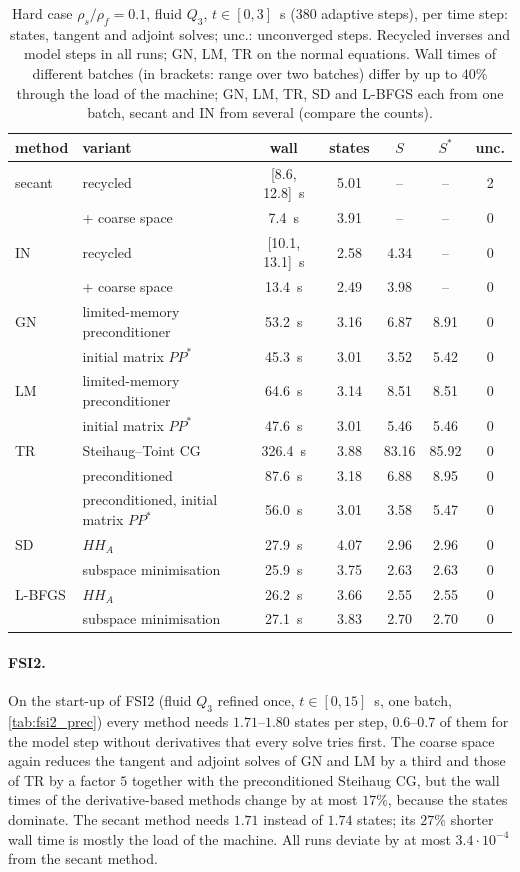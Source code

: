 \documentclass[11pt,a4paper]{article}
\theoremstyle{definition}
\theoremstyle{remark}
\begin{document}
\begin{table}[ht]\centering
\caption{Hard case $\rho_s/\rho_f=0.1$, fluid $Q_3$, $t\in[0,3]$~s ($380$ adaptive steps), per time
step: states, tangent and adjoint solves; unc.: unconverged steps. Recycled inverses and model
steps in all runs; GN, LM, TR on the normal equations. Wall times of different batches (in
brackets: range over two batches) differ by up to $40\%$ through the load of the machine; GN, LM,
TR, SD and L-BFGS each from one batch, secant and IN from several (compare the counts).}\label{tab:hard}
\begin{tabular}{llccccc}
\toprule
method & variant & wall & states & $S$ & $S^*$ & unc.\\
\midrule
secant & recycled & [8.6, 12.8]~s & 5.01 & -- & -- & 2\\
 & + coarse space & 7.4~s & 3.91 & -- & -- & 0\\
IN & recycled & [10.1, 13.1]~s & 2.58 & 4.34 & -- & 0\\
 & + coarse space & 13.4~s & 2.49 & 3.98 & -- & 0\\
GN & limited-memory preconditioner & 53.2~s & 3.16 & 6.87 & 8.91 & 0\\
 & initial matrix $PP^*$ & 45.3~s & 3.01 & 3.52 & 5.42 & 0\\
LM & limited-memory preconditioner & 64.6~s & 3.14 & 8.51 & 8.51 & 0\\
 & initial matrix $PP^*$ & 47.6~s & 3.01 & 5.46 & 5.46 & 0\\
TR & Steihaug--Toint CG & 326.4~s & 3.88 & 83.16 & 85.92 & 0\\
 & preconditioned & 87.6~s & 3.18 & 6.88 & 8.95 & 0\\
 & preconditioned, initial matrix $PP^*$ & 56.0~s & 3.01 & 3.58 & 5.47 & 0\\
SD & $HH_A$ & 27.9~s & 4.07 & 2.96 & 2.96 & 0\\
 & subspace minimisation & 25.9~s & 3.75 & 2.63 & 2.63 & 0\\
L-BFGS & $HH_A$ & 26.2~s & 3.66 & 2.55 & 2.55 & 0\\
 & subspace minimisation & 27.1~s & 3.83 & 2.70 & 2.70 & 0\\
\bottomrule
\end{tabular}
\end{table}

\paragraph{FSI2.} On the start-up of FSI2 (fluid $Q_3$ refined once, $t\in[0,15]$~s, one batch,
\cref{tab:fsi2_prec}) every method needs $1.71$--$1.80$ states per step, $0.6$--$0.7$ of them for the model step
without derivatives that every solve tries first. The coarse space again reduces the tangent
and adjoint solves of GN and LM by a third and those of TR by a factor $5$ together with the
preconditioned Steihaug CG, but the wall times of the derivative-based methods change by at most
$17\%$, because the states dominate. The secant method needs $1.71$ instead of $1.74$ states; its $27\%$ shorter wall time is
mostly the load of the machine. All runs deviate by at most $3.4\cdot10^{-4}$ from the secant
method.
\end{document}
